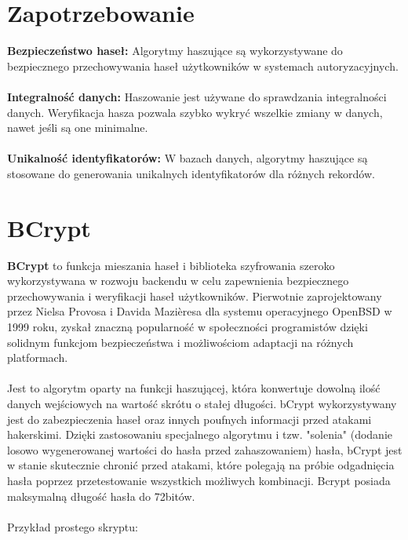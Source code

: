 \documentclass[12pt, letterpaper]{article}
\begin{document}
\section{Zapotrzebowanie}
\textbf{Bezpieczeństwo haseł:} Algorytmy haszujące są wykorzystywane do bezpiecznego przechowywania haseł użytkowników w systemach autoryzacyjnych.
\\
\\
\textbf{Integralność danych:} Haszowanie jest używane do sprawdzania integralności danych. Weryfikacja hasza pozwala szybko wykryć wszelkie zmiany w danych, nawet jeśli są one minimalne.
\\
\\
\textbf{Unikalność identyfikatorów:} W bazach danych, algorytmy haszujące są stosowane do generowania unikalnych identyfikatorów dla różnych rekordów.


\newpage
\section{BCrypt}
\textbf{BCrypt} to funkcja mieszania haseł i biblioteka szyfrowania szeroko wykorzystywana w rozwoju backendu w celu zapewnienia bezpiecznego przechowywania i weryfikacji haseł użytkowników. Pierwotnie zaprojektowany przez Nielsa Provosa i Davida Mazièresa dla systemu operacyjnego OpenBSD w 1999 roku, zyskał znaczną popularność w społeczności programistów dzięki solidnym funkcjom bezpieczeństwa i możliwościom adaptacji na różnych platformach.
\\
\\
Jest to algorytm oparty na funkcji haszującej, która konwertuje dowolną ilość danych wejściowych na wartość skrótu o stałej długości.
bCrypt wykorzystywany jest do zabezpieczenia haseł oraz innych poufnych informacji przed atakami hakerskimi. Dzięki zastosowaniu specjalnego algorytmu i tzw. "solenia" (dodanie losowo wygenerowanej wartości do hasła przed zahaszowaniem)  hasła, bCrypt jest w stanie skutecznie chronić przed atakami, które polegają na próbie odgadnięcia hasła poprzez przetestowanie wszystkich możliwych kombinacji. Bcrypt posiada maksymalną długość hasła do 72bitów.
\\
\\
Przykład prostego skryptu:
\end{document}
